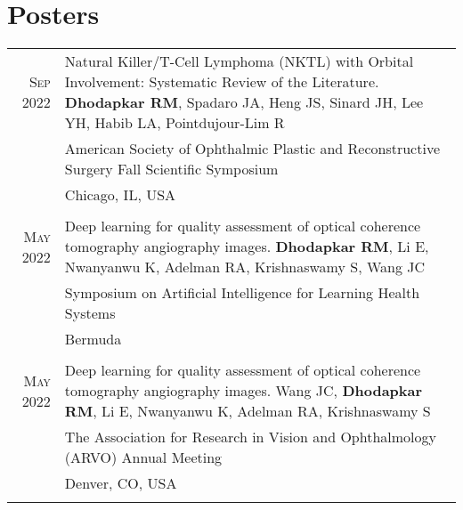 \documentclass[a4paper,10pt]{article}
\begin{document}
\section{Posters}
\begin{tabular}{rp{11cm}}
 \textsc{Sep} 2022 & Natural Killer/T-Cell Lymphoma (NKTL) with Orbital Involvement: Systematic Review of the Literature. {\bf Dhodapkar RM}, Spadaro JA, Heng JS, Sinard JH, Lee YH, Habib LA, Pointdujour-Lim R \\
 								 & American Society of Ophthalmic Plastic and Reconstructive Surgery Fall Scientific Symposium \\
 								 & Chicago, IL, USA  \\
 \multicolumn{2}{c}{} \\
 \textsc{May} 2022 & Deep learning for quality assessment of optical coherence tomography angiography
images. {\bf Dhodapkar RM}, Li E, Nwanyanwu K, Adelman RA, Krishnaswamy S, Wang JC \\
 								 & Symposium on Artificial Intelligence for Learning Health Systems \\
 								 & Bermuda  \\
 \multicolumn{2}{c}{} \\
 \textsc{May} 2022 & Deep learning for quality assessment of optical coherence tomography angiography
images. Wang JC, {\bf Dhodapkar RM}, Li E, Nwanyanwu K, Adelman RA, Krishnaswamy S\\
 								 & The Association for Research in Vision and Ophthalmology (ARVO) Annual Meeting \\
 								 & Denver, CO, USA  \\
 \multicolumn{2}{c}{} \\


\end{tabular}
\end{document}
